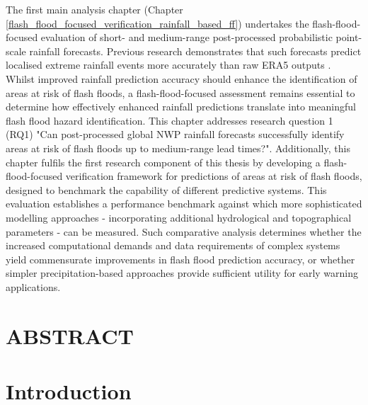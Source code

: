 The first main analysis chapter (Chapter \ref{flash_flood_focused_verification_rainfall_based_ff}) undertakes the flash-flood-focused evaluation of short- and medium-range post-processed probabilistic point-scale rainfall forecasts. Previous research demonstrates that such forecasts predict localised extreme rainfall events more accurately than raw ERA5 outputs \citep{Pillosu_2025a}. Whilst improved rainfall prediction accuracy should enhance the identification of areas at risk of flash floods, a flash-flood-focused assessment remains essential to determine how effectively enhanced rainfall predictions translate into meaningful flash flood hazard identification. This chapter addresses \textcolor{colour_chapter5}{research question 1 (RQ1) "Can post-processed global NWP rainfall forecasts successfully identify areas at risk of flash floods up to medium-range lead times?"}. Additionally, this chapter fulfils the first research component of this thesis by \textcolor{colour_chapter5}{developing a flash-flood-focused verification framework for predictions of areas at risk of flash floods, designed to benchmark the capability of different predictive systems}. This evaluation establishes a performance benchmark against which more sophisticated modelling approaches - incorporating additional hydrological and topographical parameters - can be measured. Such comparative analysis determines whether the increased computational demands and data requirements of complex systems yield commensurate improvements in flash flood prediction accuracy, or whether simpler precipitation-based approaches provide sufficient utility for early warning applications.


\clearpage

\section*{ABSTRACT}

\clearpage



\section{Introduction}


